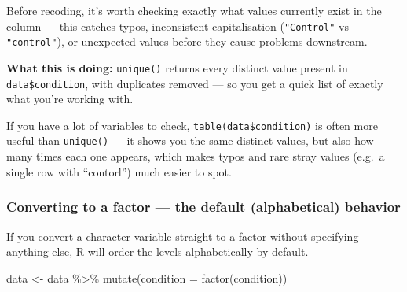 \documentclass[
  letterpaper,
  DIV=11,
  numbers=noendperiod]{scrreprt}
\newenvironment{Shaded}{\begin{snugshade}}{\end{snugshade}}
\newcommand{\AttributeTok}[1]{\textcolor[rgb]{0.40,0.45,0.13}{#1}}
\newcommand{\FunctionTok}[1]{\textcolor[rgb]{0.28,0.35,0.67}{#1}}
\newcommand{\NormalTok}[1]{\textcolor[rgb]{0.00,0.23,0.31}{#1}}
\newcommand{\OtherTok}[1]{\textcolor[rgb]{0.00,0.23,0.31}{#1}}
\newcommand{\SpecialCharTok}[1]{\textcolor[rgb]{0.37,0.37,0.37}{#1}}
\begin{document}
Before recoding, it's worth checking exactly what values currently exist
in the column --- this catches typos, inconsistent capitalisation
(\texttt{"Control"} vs \texttt{"control"}), or unexpected values before
they cause problems downstream.

\begin{Shaded}
\end{Shaded}

\textbf{What this is doing:} \texttt{unique()} returns every distinct
value present in \texttt{data\$condition}, with duplicates removed ---
so you get a quick list of exactly what you're working with.

\begin{tcolorbox}[enhanced jigsaw, toprule=.15mm, coltitle=black, colframe=quarto-callout-tip-color-frame, colbacktitle=quarto-callout-tip-color!10!white, opacityback=0, left=2mm, breakable, rightrule=.15mm, bottomrule=.15mm, leftrule=.75mm, titlerule=0mm, arc=.35mm, opacitybacktitle=0.6, toptitle=1mm, bottomtitle=1mm, title=\textcolor{quarto-callout-tip-color}{\faLightbulb}\hspace{0.5em}{Tip}, colback=white]

If you have a lot of variables to check, \texttt{table(data\$condition)}
is often more useful than \texttt{unique()} --- it shows you the same
distinct values, but also how many times each one appears, which makes
typos and rare stray values (e.g.~a single row with ``contorl'') much
easier to spot.

\end{tcolorbox}

\subsubsection{Converting to a factor --- the default (alphabetical)
behavior}\label{converting-to-a-factor-the-default-alphabetical-behavior}

If you convert a character variable straight to a factor without
specifying anything else, R will order the levels alphabetically by
default.

\begin{Shaded}
\begin{Highlighting}[]
\NormalTok{data }\OtherTok{\textless{}{-}}\NormalTok{ data }\SpecialCharTok{\%\textgreater{}\%}
  \FunctionTok{mutate}\NormalTok{(}\AttributeTok{condition =} \FunctionTok{factor}\NormalTok{(condition))}
\end{Highlighting}
\end{Shaded}
\end{document}
